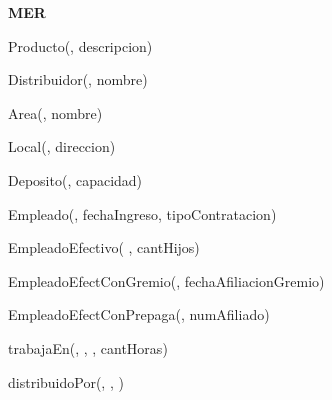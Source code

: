 %
%

\textbf{MER}

Producto(, descripcion)

Distribuidor(, nombre)

Area(, nombre)

Local(, direccion)

Deposito(,  capacidad)

Empleado(, fechaIngreso, tipoContratacion)

EmpleadoEfectivo( , cantHijos)

EmpleadoEfectConGremio(, fechaAfiliacionGremio)

EmpleadoEfectConPrepaga(, numAfiliado)

trabajaEn(, , , cantHoras)

distribuidoPor(, , )
